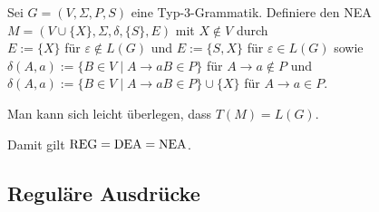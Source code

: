 \begin{Beweis}
    Sei $G = (V, \Sigma, P, S)$ eine Typ-3-Grammatik.
    Definiere den NEA\\
    $M = (V \cup \{X\}, \Sigma, \delta, \{S\}, E)$ mit $X \notin V$ durch\\
    $E := \{X\}$ für $\varepsilon \notin L(G)$ und
    $E := \{S, X\}$ für $\varepsilon \in L(G)$ sowie\\
    $\delta(A, a) := \{B \in V \;|\; A \rightarrow aB \in P\}$ für
    $A \rightarrow a \notin P$ und\\
    $\delta(A, a) := \{B \in V \;|\; A \rightarrow aB \in P\} \cup \{X\}$ für
    $A \rightarrow a \in P$.
    
    Man kann sich leicht überlegen, dass $T(M) = L(G)$.
\end{Beweis}

\begin{Bem}
    Damit gilt $\text{REG} = \text{DEA} = \text{NEA}$.
\end{Bem}

\pagebreak

\subsection{%
    Reguläre Ausdrücke%
}

